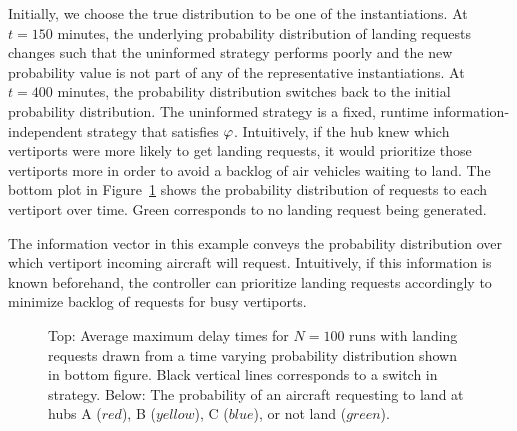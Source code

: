 Initially, we choose the true distribution to be one of the instantiations. At $t=150$ minutes, the underlying probability distribution of landing requests changes such that the uninformed strategy performs poorly and the new probability value is not part of any of the representative instantiations. At $t=400$ minutes, the probability distribution switches back to the initial probability distribution. The uninformed strategy is a fixed, runtime information-independent strategy that satisfies $\varphi$.
 Intuitively, if the hub knew which vertiports were more likely to get landing requests, it would prioritize those vertiports more in order to avoid a backlog of air vehicles waiting to land. The bottom plot in Figure~\ref{fig:delay} shows the probability distribution of requests to each vertiport over time. Green corresponds to no landing request being generated. 

%
 The information vector in this example conveys the probability distribution over which vertiport incoming aircraft will request. Intuitively, if this information is known beforehand, the controller can prioritize landing requests accordingly to minimize backlog of requests for busy vertiports. 



\begin{figure}
    \centering
    
    \caption{Top: Average maximum delay times for $N=100$ runs with landing requests drawn from a time varying probability distribution shown in bottom figure. Black vertical lines corresponds to a switch in strategy. Below: The probability of an aircraft requesting to land at hubs A ($red$), B ($yellow$), C ($blue$), or not land ($green$).}
    \label{fig:delay}
\end{figure}




